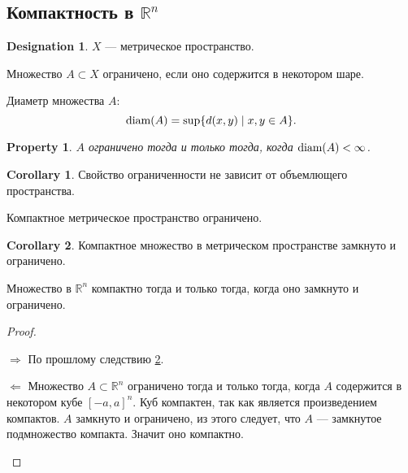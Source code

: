 \documentclass[11pt]{book}
\newcommand{\R}{\mathbb{R}}
\newcommand{\diam}{{\mathop{\text{\rm diam}}}}
\theoremstyle{definition}
\theoremstyle{plain}
\theoremstyle{plain}
\newtheorem*{prop}{Property}
\theoremstyle{definition}
\newtheorem*{cor}{Corollary}
\newtheorem*{name}{Designation}
\theoremstyle{remark}
\begin{document}
\subsection{Компактность в $ \R^{n} $ }
\begin{name}
    $ X$ --- метрическое пространство.
\end{name}
\begin{defn}
    Множество $ A \subset X$ ограничено, если оно содержится в некотором шаре.
\end{defn}
\begin{defn}
    Диаметр множества $ A$:
     \[
	 \diam(A) = 
	 \sup \{d(x, y) \mid x, y \in  A\}
    .\] 
\end{defn}
\begin{prop}
    $ A$ ограничено  тогда и только тогда, когда  $ \diam(A) < \infty$.
\end{prop}
\begin{cor}
    Свойство ограниченности не зависит от объемлющего пространства.
\end{cor}
\begin{thm}
    Компактное метрическое пространство ограничено. 
\end{thm}
\begin{cor}\label{cor_comp_zo}
    Компактное множество в метрическом пространстве замкнуто и ограничено.
\end{cor}
\begin{thm}
    Множество в $ \R^{n} $ компактно тогда и только тогда, когда оно замкнуто и ограничено.
\end{thm}
\begin{proof}
    $ $
    \begin{description}
	\item $ \boxed{ \Longrightarrow }$ По прошлому следствию \ref{cor_comp_zo}.
	\item $ \boxed{ \Longleftarrow }$  Множество $ A \subset \R^{n} $ ограничено тогда и только тогда, когда $ A$ содержится в некотором кубе  $ [-a, a]^{n}$. Куб компактен, так как является произведением компактов. $ A$ замкнуто и ограничено, из этого следует, что  $ A$ --- замкнутое подмножество компакта. Значит оно компактно.
    \end{description}
\end{proof}
\end{document}

